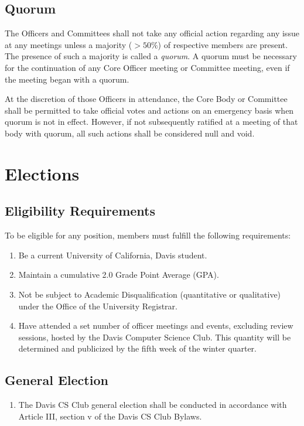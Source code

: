 \documentclass{article}
\newenvironment{li}{
\begin{enumerate}
  \setlength{\itemsep}{1pt}
  \setlength{\parskip}{0pt}
  \setlength{\parsep}{0pt}
}{\end{enumerate}}
\begin{document}

\subsection{Quorum}
The Officers and Committees shall not take any official action regarding any issue at any meetings unless a majority ($>50\%$) of respective members are present. The presence of such a majority is called a \textit{quorum}. A quorum must be necessary for the continuation of any Core Officer meeting or Committee meeting, even if the meeting began with a quorum.

At the discretion of those Officers in attendance, the Core Body or Committee shall be permitted to take official votes and actions on an emergency basis when quorum is not in effect. However, if not subsequently ratified at a meeting of that body with quorum, all such actions shall be considered null and void.


\section{Elections}

\subsection{Eligibility Requirements}
To be eligible for any position, members must fulfill the following requirements:
\begin{li}
\item Be a current University of California, Davis student.
\item Maintain a cumulative 2.0 Grade Point Average (GPA).
\item Not be subject to Academic Disqualification (quantitative or qualitative) under the Office of the University Registrar.
\item Have attended a set number of officer meetings and events, excluding review sessions, hosted by the Davis Computer Science Club. This quantity will be determined and publicized by the fifth week of the winter quarter.
\end{li}

\subsection{General Election}
\begin{li}
\item The Davis CS Club general election shall be conducted in accordance with Article III, section v of the Davis CS Club Bylaws.
\end{li}
\end{document}
